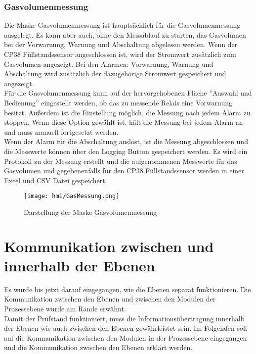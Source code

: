 \subsubsection{Gasvolumenmessung}
Die Maske Gasvolumenmessung ist hauptsächlich für die Gasvolumenmessung ausgelegt. Es kann aber auch, ohne den Messablauf zu starten, das Gasvolumen bei der Vorwarnung, Warnung und Abschaltung abgelesen werden. Wenn der CP38 Füllstandssensor angeschlossen ist, wird der Stromwert zusätzlich zum Gasvolumen angezeigt. Bei den Alarmen: Vorwarnung, Warnung und Abschaltung wird zusätzlich der dazugehörige Stromwert gespeichert und angezeigt.
\\
Für die Gasvolumenmessung kann auf der hervorgehobenen Fläche ''Auswahl und Bedienung'' eingestellt werden, ob das zu messende Relais eine Vorwarnung besitzt. Außerdem ist die Einstellung möglich, die Messung nach jedem Alarm zu stoppen. Wenn diese Option gewählt ist, hält die Messung bei jedem Alarm an und muss manuell fortgesetzt werden.
\\
Wenn der Alarm für die Abschaltung auslöst, ist die Messung abgeschlossen und die Messwerte können über den Logging Button gespeichert werden. Es wird ein Protokoll zu der Messung erstellt und die aufgenommenen Messwerte für das Gasvolumen und gegebenenfalls für den CP38 Füllstandssensor werden in einer Excel und CSV Datei gespeichert.
\vspace*{\fill}
\begin{figure}[h]
\centering
\texttt{[image: hmi/GasMessung.png]}
\caption{Darstellung der Maske Gasvolumenmessung}
\label{abbildung_gasmessung}
\end{figure}
\vspace*{4cm}

\newpage
\section{Kommunikation zwischen und innerhalb der Ebenen}
Es wurde bis jetzt darauf eingegangen, wie die Ebenen separat funktionieren. Die Kommunikation zwischen den Ebenen und zwischen den Modulen der Prozessebene wurde am Rande erwähnt.
\\
Damit der Prüfstand funktioniert, muss die Informationsübertragung innerhalb der Ebenen wie auch zwischen den Ebenen gewährleistet sein. Im Folgenden soll auf die Kommunikation zwischen den Modulen in der Prozessebene eingegangen und die Kommunikation zwischen den Ebenen erklärt werden.

